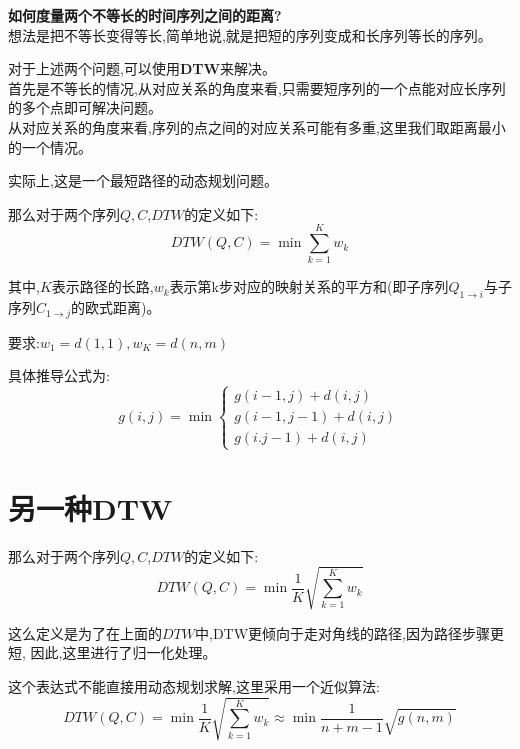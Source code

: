 \documentclass[UTF8,a4paper]{ctexart}
\newcommand{\spaceline}{\vspace{\baselineskip}}
\begin{document}
  \spaceline

  \textbf{如何度量两个不等长的时间序列之间的距离?}\\
  想法是把不等长变得等长,简单地说,就是把短的序列变成和长序列等长的序列。

  \spaceline

  对于上述两个问题,可以使用\textbf{DTW}来解决。\\
  首先是不等长的情况,从对应关系的角度来看,只需要短序列的一个点能对应长序列的多个点即可解决问题。\\
  从对应关系的角度来看,序列的点之间的对应关系可能有多重,这里我们取距离最小的一个情况。

  \spaceline

  实际上,这是一个最短路径的动态规划问题。

  那么对于两个序列$Q,C$,$DTW$的定义如下:
  \begin{equation}
    DTW(Q,C) = \min \sum_{k = 1}^{K} w_k
  \end{equation}

  其中,$K$表示路径的长路,$w_k$表示第k步对应的映射关系的平方和(即子序列$Q_{1\to i}$与子序列$C_{1\to j}$的欧式距离)。

  要求:$w_1 = d(1,1) , w_K = d(n,m)$

  具体推导公式为:
  \begin{equation}
    g(i,j) = \min  \left \{
    \begin{array}{l}
      g(i - 1,j) + d(i,j)\\
      g(i - 1, j - 1) + d(i , j)\\
      g(i.j - 1) + d(i , j)
    \end{array}
    \right .
  \end{equation}

  \section{另一种DTW}
  那么对于两个序列$Q,C$,$DTW$的定义如下:
  \begin{equation}
    DTW(Q,C) = \min \frac{1}{K} \sqrt{ \sum_{k = 1}^{K} w_k}
  \end{equation}

  这么定义是为了在上面的$DTW$中,DTW更倾向于走对角线的路径,因为路径步骤更短,
  因此,这里进行了归一化处理。

  这个表达式不能直接用动态规划求解,这里采用一个近似算法:
  \begin{equation}
    DTW(Q,C) = \min \frac{1}{K} \sqrt{ \sum_{k = 1}^{K} w_k}\approx \min \frac{1}{n+m-1} \sqrt{ g(n,m)}
  \end{equation}
\end{document}
